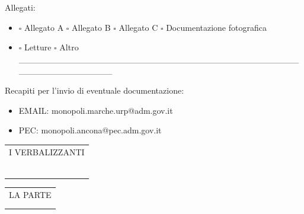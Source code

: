 \documentclass[12pt]{article}
\makeatletter
\newcommand\signature{%
  \par\vspace{8ex}\noindent
  \begin{tabular}[t]{@{}c@{}}
    I VERBALIZZANTI\\ \\
    \makebox[15em]{\dotfill}\\
    \\
    \makebox[15em]{\dotfill}\\
    \\
    \makebox[15em]{\dotfill}
  \end{tabular}
  \hfill
  \begin{tabular}[t]{@{}c@{}}
    LA PARTE\\ \\
    \makebox[15em]{\dotfill}
  \end{tabular}
}
\makeatother
\begin{document}
Allegati: 
\begin{itemize}[label={}]
    \item \begin{math}\square\end{math} Allegato A \begin{math}\square\end{math} Allegato B \begin{math}\square\end{math} Allegato C \begin{math}\square\end{math} Documentazione fotografica
    \item \begin{math}\square\end{math} Letture \begin{math}\square\end{math} Altro \_\_\_\_\_\_\_\_\_\_\_\_\_\_\_\_\_\_\_\_\_\_\_\_\_\_\_\_\_\_\_\_\_\_\_\_\_\_\_\_\_\_\_\_\_\_\_\_\_\_\_\_\_\_\_\_\_\_\_\_
\end{itemize}

Recapiti per l'invio di eventuale documentazione:
\begin{itemize}[label={}]
    \item EMAIL: monopoli.marche.urp@adm.gov.it
    \item PEC: monopoli.ancona@pec.adm.gov.it
\end{itemize}

\signature
\end{document}
